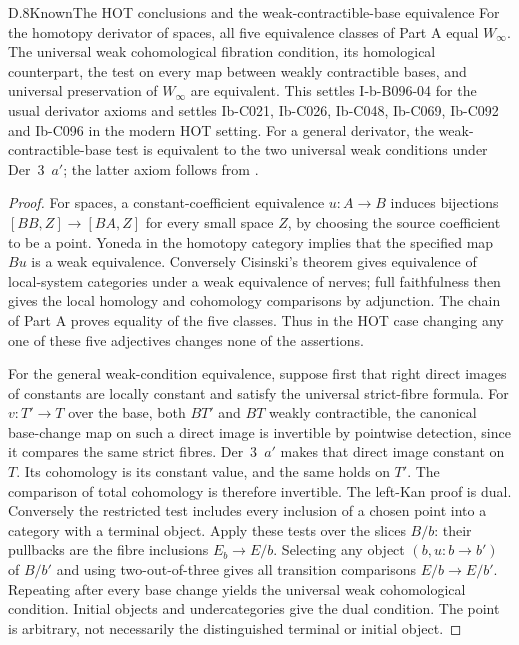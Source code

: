 \begin{claim}{D.8}{Known}{The HOT conclusions and the weak-contractible-base equivalence}
For the homotopy derivator of spaces, all five equivalence classes of Part A equal $W_\infty$. The universal weak cohomological fibration condition, its homological counterpart, the test on every map between weakly contractible bases, and universal preservation of $W_\infty$ are equivalent. This settles I-b-B096-04 for the usual derivator axioms and settles Ib-C021, Ib-C026, Ib-C048, Ib-C069, Ib-C092 and Ib-C096 in the modern HOT setting. For a general derivator, the weak-contractible-base test is equivalent to the two universal weak conditions under Der~3~$a'$; the latter axiom follows from \citet[Corollary 3.8]{Cisinski2009LocallyConstant}.
\end{claim}
\begin{proof}
For spaces, a constant-coefficient equivalence $u:A\to B$ induces bijections $[BB,Z]\to[BA,Z]$ for every small space $Z$, by choosing the source coefficient to be a point. Yoneda in the homotopy category implies that the specified map $Bu$ is a weak equivalence. Conversely Cisinski's theorem gives equivalence of local-system categories under a weak equivalence of nerves; full faithfulness then gives the local homology and cohomology comparisons by adjunction. The chain of Part A proves equality of the five classes. Thus in the HOT case changing any one of these five adjectives changes none of the assertions.

For the general weak-condition equivalence, suppose first that right direct images of constants are locally constant and satisfy the universal strict-fibre formula. For $v:T'\to T$ over the base, both $BT'$ and $BT$ weakly contractible, the canonical base-change map on such a direct image is invertible by pointwise detection, since it compares the same strict fibres. Der~3~$a'$ makes that direct image constant on $T$. Its cohomology is its constant value, and the same holds on $T'$. The comparison of total cohomology is therefore invertible. The left-Kan proof is dual. Conversely the restricted test includes every inclusion of a chosen point into a category with a terminal object. Apply these tests over the slices $B/b$: their pullbacks are the fibre inclusions $E_b\to E/b$. Selecting any object $(b,u:b\to b')$ of $B/b'$ and using two-out-of-three gives all transition comparisons $E/b\to E/b'$. Repeating after every base change yields the universal weak cohomological condition. Initial objects and undercategories give the dual condition. The point is arbitrary, not necessarily the distinguished terminal or initial object.


\end{proof}
